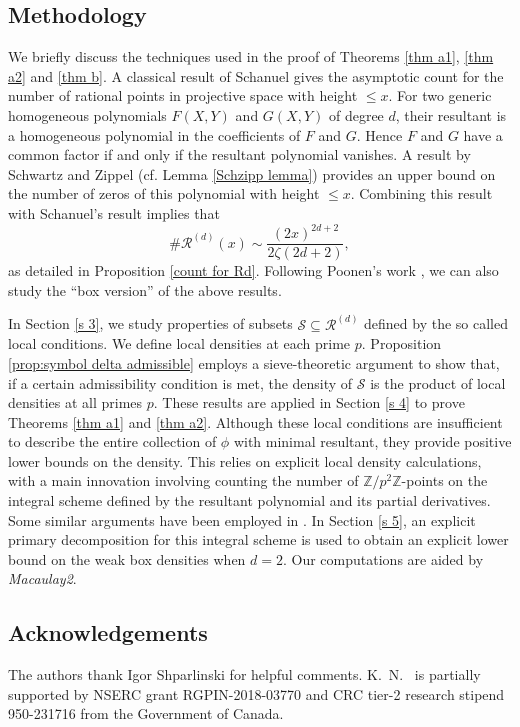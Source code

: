 \documentclass[12pt]{amsart}
\newcommand{\cR}{\mathcal{R}}
\numberwithin{equation}{section}
\begin{document}
\subsection{Methodology}  We briefly discuss the techniques used in the proof of Theorems \ref{thm a1}, \ref{thm a2} and \ref{thm b}. A classical result of Schanuel \cite{schanuel} gives the asymptotic count for the number of rational points in projective space with height $\leq x$. For two generic homogeneous polynomials $F(X,Y)$ and $G(X,Y)$ of degree $d$, 
their resultant is a homogeneous polynomial in the coefficients of $F$ and $G$. 
Hence $F$ and $G$ have a common factor if and only if the resultant polynomial vanishes. A result by Schwartz and Zippel (cf. Lemma \ref{Schzipp lemma}) provides an upper bound on the number of zeros of this polynomial with height $\leq x$. Combining this result with Schanuel's result implies that
\[
\# \cR^{(d)}(x) \sim \frac{(2x)^{2d+2}}{2\zeta(2d+2)},
\]
as detailed in Proposition \ref{count for Rd}. Following Poonen's work \cite{Poonensquarefree}, we can also study the ``box version'' of the above results.

In Section \ref{s 3}, we study properties of subsets $\mathcal{S} \subseteq \cR^{(d)}$ defined by the so called local conditions. We define local densities at each prime $p$. Proposition \ref{prop:symbol delta admissible} employs a sieve-theoretic argument to show that, if a certain admissibility condition is met, the density of $\mathcal{S}$ is the product of local densities at all primes $p$. These results are applied in Section \ref{s 4} to prove Theorems \ref{thm a1} and \ref{thm a2}. Although these local conditions are insufficient to describe the entire collection of $\phi$ with minimal resultant, they provide positive lower bounds on the density. This relies on explicit local density calculations, with a main innovation involving counting the number of $\mathbb{Z}/p^2\mathbb{Z}$-points on the integral scheme defined by the resultant polynomial and its partial derivatives. Some similar arguments have been employed in \cite{Poonensquarefree}.
In Section \ref{s 5}, an explicit primary decomposition for this integral scheme is used to obtain an explicit lower bound on the weak box densities when $d=2$. Our computations are aided by  \textit{Macaulay2}.

\subsection{Acknowledgements} The authors thank Igor Shparlinski for helpful comments. K.~N.~ is partially supported by NSERC grant RGPIN-2018-03770 and CRC tier-2 research stipend 950-231716 from the Government of Canada.
\end{document}
